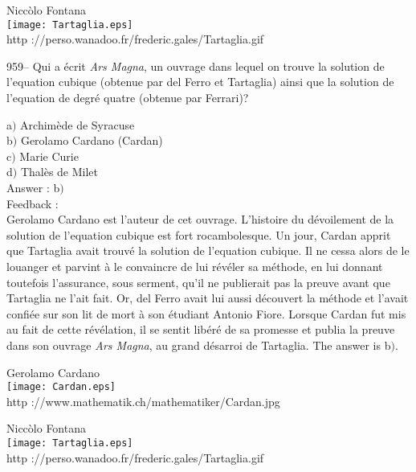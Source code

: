﻿\documentclass[letterpaper, 12pt]{article}
\begin{document}
        \begin{center}
        Nicc\`olo Fontana\\
    \texttt{[image: Tartaglia.eps]}\\
        {\footnotesize http
://perso.wanadoo.fr/frederic.gales/Tartaglia.gif}
    \end{center}

959-- Qui a \'ecrit {\sl Ars Magna}, un ouvrage dans lequel on
trouve la solution de l'equation cubique (obtenue par del Ferro et
Tartaglia) ainsi que la solution de l'equation de degr\'e quatre
(obtenue par Ferrari)?

a$)$ Archim\`ede de Syracuse  \\
b$)$ Gerolamo Cardano (Cardan)  \\
c$)$ Marie Curie  \\
d$)$ Thal\`es de Milet\\

Answer : b$)$\\

Feedback : \\
Gerolamo Cardano est l'auteur de cet ouvrage. L'histoire du
d\'evoilement de la solution de l'equation cubique est fort
rocambolesque. Un jour, Cardan apprit que Tartaglia avait trouv\'e
la solution de l'equation cubique. Il ne cessa alors de le
louanger et parvint \`a le convaincre de lui r\'ev\'eler sa
m\'ethode, en lui donnant toutefois l'assurance, sous serment, qu'il
ne publierait pas la preuve avant que Tartaglia ne l'ait fait. Or,
del Ferro avait lui aussi d\'ecouvert la m\'ethode et l'avait
confi\'ee sur son lit de mort \`a son \'etudiant Antonio Fiore.
Lorsque Cardan fut mis au fait de cette r\'ev\'elation,
il se sentit lib\'er\'e de sa promesse et publia la preuve dans son ouvrage
{\sl Ars Magna}, au grand d\'esarroi de Tartaglia. The answer is b$)$.\\

        \begin{center}
        Gerolamo Cardano\\
    \texttt{[image: Cardan.eps]}\\
        {\footnotesize http ://www.mathematik.ch/mathematiker/Cardan.jpg}
    \end{center}

        \begin{center}
        Nicc\`olo Fontana\\
    \texttt{[image: Tartaglia.eps]}\\
        {\footnotesize http
://perso.wanadoo.fr/frederic.gales/Tartaglia.gif}
    \end{center}
\end{document}
